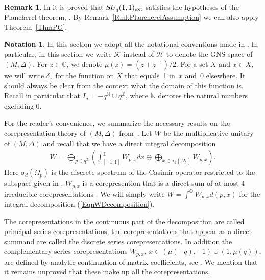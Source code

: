 \documentclass[pdftex]{sigma}
\numberwithin{equation}{section}
\theoremstyle{definition}
\newtheorem{rmk}[thm]{Remark}
\newtheorem{nt}[thm]{Notation}
\begin{document}
\begin{rmk}
In \cite[Propositions B.2 and B.3]{CasKoe} it is proved that $SU_q(1,1)_{{\rm ext}}$ satisf\/ies the hypotheses of the Plancherel theorem, \cite[Theorem 3.4.1]{Des}. By Remark~\ref{RmkPlancherelAssumption} we can also apply Theorem~\ref{ThmPG}.
\end{rmk}

\begin{nt} In this section we adopt all the notational conventions made in \cite{GroKoeKus}. In particular, in this section we write $\mathcal{K}$ instead of $\mathcal{H}$ to denote the GNS-space of $(M, \Delta)$. For $z \in \mathbb{C}$, we denote $\mu(z) = (z+z^{-1})/2$. For a set $X$ and $x \in X$, we will write $\delta_x$ for the function on $X$ that equals~1 in~$x$ and~0 elsewhere. It should always be clear from the context what the domain of this function is. Recall in particular that $I_q = - q^{\mathbb{N}} \cup q^{\mathbb{Z}}$, where $\mathbb{N}$ denotes the natural numbers excluding 0.
\end{nt}

For the reader's convenience, we summarize the necessary results on the corepresentation theory of $(M, \Delta)$ from~\cite{GroKoeKus}. Let $W$ be the multiplicative unitary of $(M, \Delta)$ and recall \cite{GroKoeKus} that we have a direct integral decomposition
\begin{gather}\label{EqnWDecomposition}
W = \bigoplus_{p \in q^\mathbb{Z}} \left( \int_{[-1,1]}^\oplus
W_{p,x} dx \oplus \bigoplus_{x\in \sigma_d(\Omega_p)} W_{p,x}
\right).
\end{gather}
Here $\sigma_d(\Omega_p)$ is the discrete spectrum of the Casimir
operator \cite[Def\/inition 4.5, Theorem 4.6]{GroKoeKus} restricted to the subspace given in
\cite[Theorem 5.7]{GroKoeKus}. $W_{p,x}$ is a corepresention that is a
direct sum of at most 4 irreducible corepresentations
\cite[Propositions 5.3 and 5.4]{GroKoeKus}.  We will simply write $W = \int^\oplus W_{p,x} d(p,x)$ for the integral decomposition (\ref{EqnWDecomposition}).

The corepresentations in the continuous part of the decomposition are called principal series corepresentations, the corepresentations that appear as a direct summand are called the discrete series corepresentations. In addition the complementary series corepresentations $W_{p,x}$, $x \in (\mu(-q), -1) \cup (1, \mu(q))$, are def\/ined by analytic continuation of matrix coef\/f\/icients, see \cite[Section~10.3]{GroKoeKus}. We mention that it remains unproved that these make up all the corepresentations.
\end{document}
